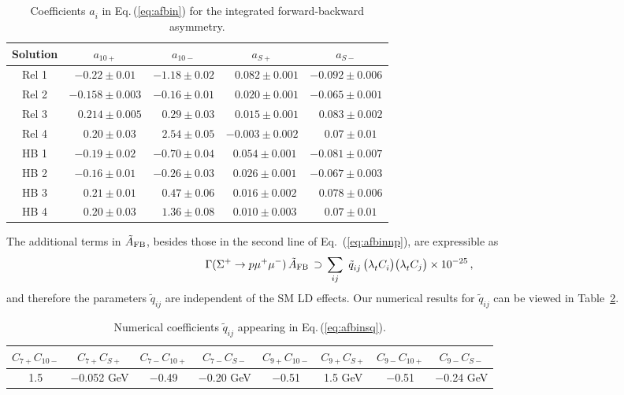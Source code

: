 \documentclass[amsmath,amssymb,aps,nofootinbib,prd,preprint,superscriptaddress,tightenlines,a4paper,bm]{revtex4-2}
\begin{document}
\begin{table}[htp] \bigskip
\centering \setlength{\tabcolsep}{1ex}
\begin{tabular}{|c|c|c|c|c|}  \hline
Solution & $a_{10+}$ & $a_{10-}$ & $a_{S+}$ & $a_{S-}$ \\ \hline
Rel 1 &  $-0.22\pm 0.01$   &  $-1.18\pm0.02$ & ~ $0.082\pm0.001$ & $-0.092\pm0.006$ \\
Rel 2 & $-0.158\pm 0.003$  &  $-0.16\pm0.01$ & ~ $0.020\pm0.001$ & $-0.065\pm0.001$ \\
Rel 3 & ~ $0.214\pm 0.005$ & ~ $0.29\pm0.03$ & ~ $0.015\pm0.001$ & ~ $0.083\pm0.002$ \\
Rel 4 & ~ $0.20\pm 0.03$   & ~ $2.54\pm0.05$ &  $-0.003\pm0.002$ & ~ $0.07\pm0.01$ \\
\hline
HB 1 &  $-0.19\pm 0.02$ &  $-0.70\pm0.04$ & ~$0.054\pm0.001$ & $-0.081\pm0.007$\\
HB 2 &  $-0.16\pm 0.01$ &  $-0.26\pm0.03$ & ~$0.026\pm0.001$ & $-0.067\pm0.003$\\
HB 3 & ~ $0.21\pm 0.01$ & ~ $0.47\pm0.06$ & ~$0.016\pm0.002$ & ~ $0.078\pm0.006$ \\
HB 4 & ~ $0.20\pm 0.03$ & ~ $1.36\pm0.08$ & ~$0.010\pm0.003$ & ~ $0.07\pm0.01$ \\ \hline
\end{tabular}
\caption{Coefficients $a_i^{}$ in Eq.\,(\ref{eq:afbin}) for the integrated forward-backward asymmetry.}
\label{t:afbcoeffs}
\end{table}
%

The additional terms in ${\tilde A}_{\rm FB}$, besides those in the second line of Eq.~(\ref{eq:afbinnp}), are expressible as
\begin{align}
  \Gamma(\Sigma^+\to p\mu^+\mu^-)\, {\tilde A}_{\rm FB} & \,\supset\, \sum_{ij}~\tilde{q}_{ij}^{}\, \big(\lambda_t^{}C_i^{}\big) \big(\lambda_t^{}C_j\big)\times 10^{-25} \,, &
  \label{eq:afbinsq}
\end{align}
and therefore the parameters $\tilde{q}_{ij}^{}$ are independent of the SM LD effects.
Our numerical results for $\tilde{q}_{ij}^{}$ can be viewed in Table~\ref{tab:quadafb}.

\begin{table}[h] \bigskip
\centering \setlength{\tabcolsep}{1ex}
\begin{tabular}{|c|c|c|c|c|c|c|c|}\hline
$C_{7+}C_{10-}$ & $C_{7+}C_{S+}$ & $C_{7-}C_{10+}$ & $C_{7-}C_{S-}$ &
$C_{9+}C_{10-}$ & $C_{9+}C_{S+}$ & $C_{9-}C_{10+}$ & $C_{9-}C_{S-}$
\\ \hline
1.5 & $-$0.052 GeV & $-$0.49 & $-$0.20 GeV & $-$0.51 & 1.5 GeV & $-$0.51 & $-$0.24 GeV \\ \hline
\end{tabular}
\caption{Numerical coefficients $\tilde q_{ij}^{}$ appearing in Eq.\,(\ref{eq:afbinsq}).}
\label{tab:quadafb}
\end{table}
\end{document}
